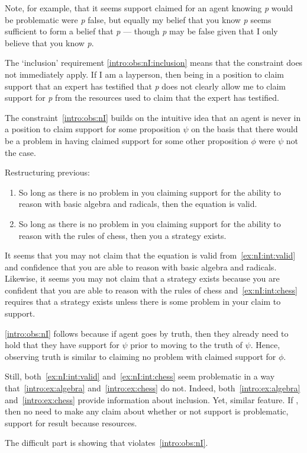 \begin{note}
{    Note, for example, that it seems support claimed for an agent knowing \emph{p} would be problematic were \emph{p} false, but equally my belief that you know \emph{p} seems sufficient to form a belief that \emph{p} --- though \emph{p} may be false given that I only believe that you know \emph{p}.

    The `inclusion' requirement \ref{intro:obs:nI:inclusion} means that the constraint does not immediately apply.
    If I am a layperson, then being in a position to claim support that an expert has testified that \emph{p} does not clearly allow me to claim support for \emph{p} from the resources used to claim that the expert has testified.
  }

  The constraint~\ref{intro:obs:nI} builds on the intuitive idea that an agent is never in a position to claim support for some proposition \(\psi\) on the basis that there would be a problem in having claimed support for some other proposition \(\phi\) were \(\psi\) not the case.

  Restructuring previous:

  \begin{enumerate}[label=(E\arabic*), ref=(E\arabic*), resume*=i_ex]
  \item\label{ex:nI:int:valid} So long as there is no problem in you claiming support for the ability to reason with basic algebra and radicals, then the equation is valid.
  \item\label{ex:nI:int:chess} So long as there is no problem in you claiming support for the ability to reason with the rules of chess, then you a strategy exists.
  \end{enumerate}

  It seems that you may not claim that the equation is valid from~\ref{ex:nI:int:valid} and confidence that you are able to reason with basic algebra and radicals.
  Likewise, it seems you may not claim that a strategy exists because you are confident that you are able to reason with the rules of chess and~\ref{ex:nI:int:chess} requires that a strategy exists unless there is some problem in your claim to support.

  \ref{intro:obs:nI} follows because if agent goes by truth, then they already need to hold that they have support for \(\psi\) prior to moving to the truth of \(\psi\).
  Hence, observing truth is similar to claiming no problem with claimed support for \(\phi\).

  Still, both~\ref{ex:nI:int:valid} and~\ref{ex:nI:int:chess} seem problematic in a way that~\ref{intro:ex:algebra} and~\ref{intro:ex:chess} do not.
  Indeed, both~\ref{intro:ex:algebra} and~\ref{intro:ex:chess} provide information about inclusion.
  Yet, similar feature.
  If \WR{}, then no need to make any claim about whether or not support is problematic, support for result because resources.

  The difficult part is showing that \AR{} violates~\ref{intro:obs:nI}.
\end{note}

